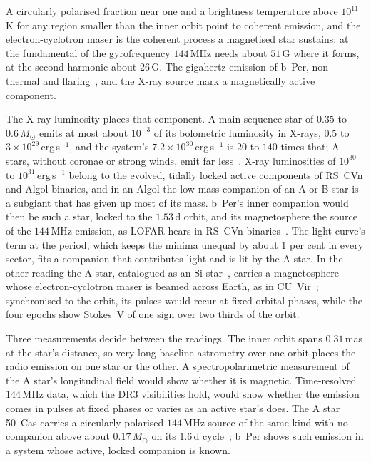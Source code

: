 \documentclass[3p,11pt]{elsarticle}
\newcommand{\sci}[2]{#1\times10^{#2}}
\newcommand{\Msun}{M_\odot}
\begin{document}
A circularly polarised fraction near one and a brightness temperature above
$10^{11}$\,K for any region smaller than the inner orbit point to coherent emission, and
the electron-cyclotron maser is the coherent process a magnetised star sustains: at the
fundamental of the gyrofrequency $144$\,MHz needs about $51$\,G where it forms, at the
second harmonic about $26$\,G. The gigahertz emission of b~Per, non-thermal and
flaring~\cite{HjellmingWade1973,Hill1976}, and the X-ray source mark a magnetically
active component.

The X-ray luminosity places that component. A main-sequence star of $0.35$ to
$0.6\,\Msun$ emits at most about $10^{-3}$ of its bolometric luminosity in X-rays, $0.5$
to $\sci{3}{29}$\,erg\,s$^{-1}$, and the system's $\sci{7.2}{30}$\,erg\,s$^{-1}$ is $20$
to $140$ times that; A stars, without coronae or strong winds, emit far
less~\cite{SchroderSchmitt2007}. X-ray
luminosities of $10^{30}$ to $10^{31}$\,erg\,s$^{-1}$ belong to the evolved, tidally locked
active components of RS~CVn and Algol binaries, and in an Algol the low-mass companion of
an A or B star is a subgiant that has given up most of its mass. b~Per's inner companion
would then be such a star, locked to the $1.53$\,d orbit, and its magnetosphere the source
of the $144$\,MHz emission, as LOFAR hears in RS~CVn binaries~\cite{Toet2021}. The light
curve's term at the period, which keeps the minima unequal by about $1$ per cent in every
sector, fits a companion that contributes light and is lit by the A star. In the other
reading the A star, catalogued as an Si star~\cite{RensonManfroid2009}, carries a
magnetosphere whose electron-cyclotron maser is beamed across Earth, as in
CU~Vir~\cite{Trigilio2000}; synchronised to the orbit, its pulses would recur at fixed
orbital phases, while the four epochs show Stokes~V of one sign over two thirds of the
orbit.

Three measurements decide between the readings. The inner orbit spans $0.31$\,mas at the
star's distance, so very-long-baseline astrometry over one orbit places the radio
emission on one star or the other. A spectropolarimetric measurement of the A star's
longitudinal field would show whether it is magnetic. Time-resolved $144$\,MHz data, which
the DR3 visibilities hold, would show whether the emission comes in pulses at fixed phases
or varies as an active star's does. The A star 50~Cas carries a circularly polarised
$144$\,MHz source of the same kind with no companion above about $0.17\,\Msun$ on its
$1.6$\,d cycle~\cite{Norton2026}; b~Per shows such emission in a system whose active,
locked companion is known.
\end{document}

